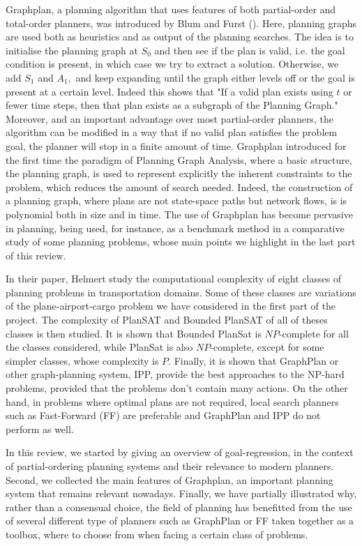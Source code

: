 \documentclass{report}
\begin{document}
Graphplan, a planning algorithm that uses features of both  partial-order and total-order planners, was introduced by Blum and Furst (\cite{Blum}). Here, planning graphs  are used both as heuristics and as output of the planning searches.  The idea is to initialise the planning graph at $S_0$ and then see if the plan is valid, i.e. the goal condition is present,  in which case we try to extract a solution. Otherwise, we add $S_1$ and $A_1,$ and keep expanding until the graph either levels off or the goal is present at a certain level. Indeed this shows that  "If a valid plan exists using $t$ or fewer time steps, then that plan exists as a subgraph of the Planning Graph." Moreover, and an important advantage over   most partial-order planners, the algorithm can be modified in a way that if no valid plan satisfies the problem goal, the planner will stop in a finite amount of time. Graphplan introduced for the first time the paradigm of Planning Graph Analysis, where a basic structure, the planning graph, is used to represent explicitly the inherent constraints to the problem, which reduces the amount of search needed. Indeed, the construction of a planning graph, where plans are not state-space paths but network flows, is is polynomial both in size and in time. The use of Graphplan has become pervasive in planning,  being used, for instance, as a benchmark method in a comparative study of some planning problems, whose main points we highlight in the last part of this review.

In their paper, Helmert \cite{Helmert} study the computational complexity of eight classes of planning problems in transportation domains. Some of these classes are  variations of the plane-airport-cargo problem we have considered in the first part of the project. The complexity of PlanSAT and Bounded PlanSAT of all of theses classes is then studied. It is shown that Bounded PlanSat is $NP$-complete for all the classes considered, while PlanSat is also $NP$-complete, except for some simpler classes, whose complexity is $P.$ Finally, it is shown that GraphPlan or other graph-planning system, IPP, provide the best approaches to the NP-hard problems, provided that the problems don't contain many actions. On the other hand, in problems where optimal plans are not required, local search planners such as Fast-Forward (FF) are preferable and GraphPlan and IPP do not perform as well. 

In this review, we started by giving an overview of  goal-regression, in the context of  partial-ordering planning systems and their relevance to modern planners. Second, we collected the main features of Graphplan, an important planning system that remains relevant nowadays. Finally, we have partially illustrated why, rather than a consensual choice, the field of planning has benefitted from the use of several different type of planners such as GraphPlan or FF taken together as a toolbox, where to choose from when facing  a certain class of problems.
\end{document}

